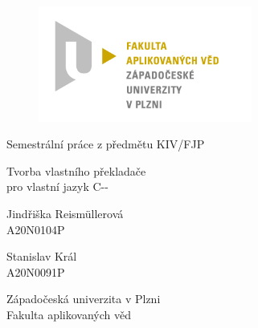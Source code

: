 \documentclass[12pt, a4paper]{article}
\begin{document}
	\renewcommand{\lstlistingname}{Ukázka kódu}
	\renewcommand{\lstlistlistingname}{Seznam ukázek kódu}
    \begin{titlepage}

        \centering

        \vspace*{\baselineskip}
        \begin{figure}[H]
        \centering
        \includegraphics[width=7cm]{img/fav-logo.jpg}
        \end{figure}

        \vspace*{1\baselineskip}

        \vspace{0.75\baselineskip}

        \vspace{0.5\baselineskip}
        {Semestrální práce z předmětu KIV/FJP}

        {\LARGE\sc Tvorba vlastního překladače\\}
        {\sc pro vlastní jazyk C-{}-\\}

        \vspace{4\baselineskip}

        \vspace{0.5\baselineskip}

        {\sc\Large Jindřiška Reismüllerová \\}
        \vspace{0.5\baselineskip}
        {A20N0104P}

        {\sc\Large Stanislav Král \\}
        \vspace{0.5\baselineskip}
        {A20N0091P}

        \vfill

        {\sc Západočeská univerzita v Plzni\\
        Fakulta aplikovaných věd}

    \end{titlepage}
\end{document}
